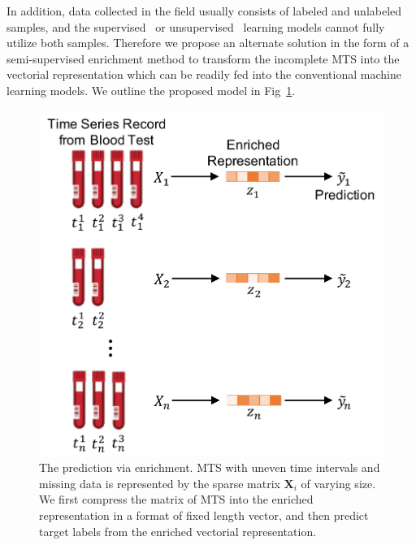 In addition, data collected in the field usually consists of labeled and unlabeled samples, and the supervised~\cite{yan2020interpretable} or unsupervised~\cite{langkvist2014review,srivastava2015unsupervised} learning models cannot fully utilize both samples. Therefore we propose an alternate solution in the form of a semi-supervised enrichment method to transform the incomplete MTS into the vectorial representation which can be readily fed into the conventional machine learning models. We outline the proposed model in Fig~\ref{fig: enrichment-learning}. %
\begin{figure}
    \centering
    \includegraphics[width=1.0\linewidth]{figures/enrichment-learning.pdf}
    \caption{The prediction via enrichment. MTS with uneven time intervals and missing data is represented by the sparse matrix $\mathbf{X}_i$ of varying size. We first compress the matrix of MTS into the enriched representation in a format of fixed length vector, and then predict target labels from the enriched vectorial representation.} \label{fig: enrichment-learning}
\end{figure}


